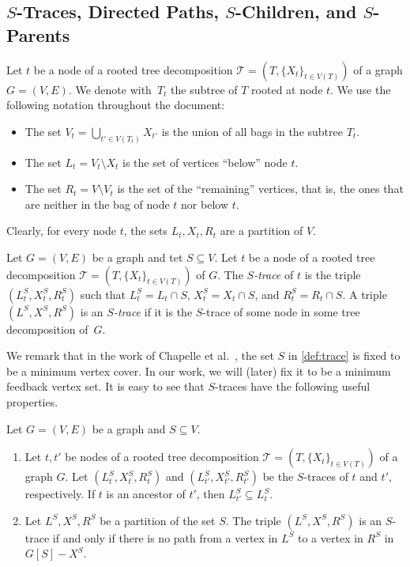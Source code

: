 \documentclass[a4paper,UKenglish,cleveref, autoref, thm-restate, numberwithinsect]{lipics-v2021}
\begin{document}
\subsection{\boldmath$S$-Traces, Directed Paths, $S$-Children, and $S$-Parents}
\label{sec:concepts}
Let $t$ be a node of a rooted tree decomposition $\mathcal{T}=(T,\{X_t\}_{t\in V(T)})$ of a graph $G=(V,E)$. We denote with~$T_t$ the subtree of $T$ rooted at node $t$. We use the following notation throughout the document:
\begin{itemize}
    \item The set $V_t=\bigcup_{t'\in V(T_t)}X_{t'}$ is the union of all bags in the subtree $T_t$.
    \item The set $L_t=V_t\setminus X_t$ is the set of vertices ``below'' node $t$.
    \item The set $R_t=V\setminus V_t$ is the set of the ``remaining'' vertices, that is, the ones that are neither in the bag of node $t$ nor below $t$.
\end{itemize}
Clearly, for every node $t$, the sets $L_t,X_t,R_t$ are a partition of $V$.
\begin{definition} \label{def:trace}
    Let $G=(V,E)$ be a graph and tet $S\subseteq V$. Let $t$ be a node of a rooted tree decomposition $\mathcal{T}=(T,\{X_t\}_{t\in V(T)})$ of $G$. 
    The \emph{$S$-trace} of $t$ is the triple $(L_t^S, X_t^S, R_t^S)$ such that $L_t^S=L_t\cap S$, $X_t^S=X_t\cap S$, and $R_t^S=R_t\cap S$. 
    A triple $(L^S,X^S,R^S)$ is an \emph{$S$-trace} if it is the $S$-trace of some node in some tree decomposition of~$G$. 
\end{definition}
We remark that in the work of Chapelle et al.~\cite{chapelle2017treewidth}, the set $S$ in \cref{def:trace} is fixed to be a minimum vertex cover. In our work, we will (later) fix it to be a minimum feedback vertex set. It is easy to see that $S$-traces have the following useful properties.
\begin{observation}\label{obs:strace}
Let $G=(V,E)$ be a graph and $S\subseteq V$.
    \begin{enumerate}
        \item Let $t,t'$ be nodes of a rooted tree decomposition $\mathcal{T}=(T,\{X_t\}_{t\in V(T)})$ of a graph $G$. Let $(L_t^S, X_t^S, R_t^S)$ and $(L_{t'}^S, X_{t'}^S, R_{t'}^S)$ be the $S$-traces of $t$ and $t'$, respectively. If $t$ is an ancestor of $t'$, then $L_{t'}^S\subseteq L_t^S$.
        \item Let $L^S,X^S,R^S$ be a partition of the set $S$. The triple $(L^S,X^S,R^S)$ is an $S$-trace if and only if there is no path from a vertex in $L^S$ to a vertex in $R^S$ in $G[S]-X^S$.
    \end{enumerate}
\end{observation}
\end{document}
